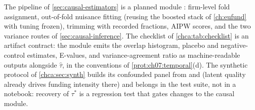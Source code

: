 \begin{codehooks}
The pipeline of \cref{sec:causal-estimators} is a planned module :
firm-level fold assignment, out-of-fold nuisance fitting (reusing the boosted stack of
\cref{ch:eufund} with tuning frozen), trimming with recorded fractions, AIPW scores, and the two
variance routes of \cref{sec:causal-inference}. The checklist of \cref{chca:tab:checklist} is an
artifact contract: the module emits the overlap histogram, placebo and negative-control
estimates, E-values, and variance-agreement ratio as machine-readable outputs alongside
$\hat\tau$, in the  conventions of \cref{prot:ch07:temporal}(d). The synthetic
protocol of \cref{chca:sec:synth} builds its confounded panel from  and
 (latent quality already drives funding intensity there) and
belongs in the test suite, not in a notebook: recovery of $\tau^*$ is a regression test that
gates changes to the causal module.
\end{codehooks}
